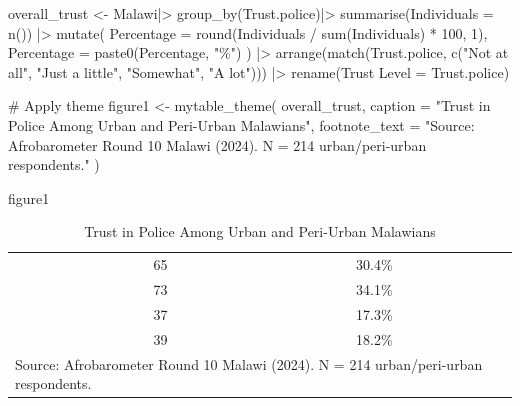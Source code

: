 \documentclass[
  letterpaper,
  DIV=11,
  numbers=noendperiod]{scrartcl}
\newenvironment{Shaded}{\begin{snugshade}}{\end{snugshade}}
\newcommand{\AttributeTok}[1]{\textcolor[rgb]{0.40,0.45,0.13}{#1}}
\newcommand{\CommentTok}[1]{\textcolor[rgb]{0.37,0.37,0.37}{#1}}
\newcommand{\DecValTok}[1]{\textcolor[rgb]{0.68,0.00,0.00}{#1}}
\newcommand{\FunctionTok}[1]{\textcolor[rgb]{0.28,0.35,0.67}{#1}}
\newcommand{\NormalTok}[1]{\textcolor[rgb]{0.00,0.23,0.31}{#1}}
\newcommand{\OtherTok}[1]{\textcolor[rgb]{0.00,0.23,0.31}{#1}}
\newcommand{\SpecialCharTok}[1]{\textcolor[rgb]{0.37,0.37,0.37}{#1}}
\newcommand{\StringTok}[1]{\textcolor[rgb]{0.13,0.47,0.30}{#1}}
\begin{document}
\begin{Shaded}
\begin{Highlighting}[]
\NormalTok{overall\_trust }\OtherTok{\textless{}{-}}\NormalTok{ Malawi}\SpecialCharTok{|\textgreater{}}
  \FunctionTok{group\_by}\NormalTok{(Trust.police)}\SpecialCharTok{|\textgreater{}}
  \FunctionTok{summarise}\NormalTok{(}\AttributeTok{Individuals =} \FunctionTok{n}\NormalTok{()) }\SpecialCharTok{|\textgreater{}}
  \FunctionTok{mutate}\NormalTok{(}
    \AttributeTok{Percentage =} \FunctionTok{round}\NormalTok{(Individuals }\SpecialCharTok{/} \FunctionTok{sum}\NormalTok{(Individuals) }\SpecialCharTok{*} \DecValTok{100}\NormalTok{, }\DecValTok{1}\NormalTok{),}
    \AttributeTok{Percentage =} \FunctionTok{paste0}\NormalTok{(Percentage, }\StringTok{"\%"}\NormalTok{)}
\NormalTok{    ) }\SpecialCharTok{|\textgreater{}}
 \FunctionTok{arrange}\NormalTok{(}\FunctionTok{match}\NormalTok{(Trust.police, }
                \FunctionTok{c}\NormalTok{(}\StringTok{"Not at all"}\NormalTok{, }\StringTok{"Just a little"}\NormalTok{, }\StringTok{"Somewhat"}\NormalTok{, }\StringTok{"A lot"}\NormalTok{))) }\SpecialCharTok{|\textgreater{}}
  \FunctionTok{rename}\NormalTok{(}\StringTok{\textasciigrave{}}\AttributeTok{Trust Level}\StringTok{\textasciigrave{}} \OtherTok{=}\NormalTok{ Trust.police)}


\CommentTok{\# Apply theme}
\NormalTok{figure1 }\OtherTok{\textless{}{-}} \FunctionTok{mytable\_theme}\NormalTok{(}
\NormalTok{  overall\_trust,}
  \AttributeTok{caption =} \StringTok{"Trust in Police Among Urban and Peri{-}Urban Malawians"}\NormalTok{,}
  \AttributeTok{footnote\_text =} \StringTok{"Source: Afrobarometer Round 10 Malawi (2024). N = 214 urban/peri{-}urban respondents."}
\NormalTok{)}

\NormalTok{figure1}
\end{Highlighting}
\end{Shaded}

\begin{table}[!h]
\centering
\caption{\label{tab:unnamed-chunk-4}Trust in Police Among Urban and Peri-Urban Malawians}
\centering
\begin{tabular}[t]{>{}lcc}
\toprule
\cellcolor[HTML]{2E86AB}{\textcolor[HTML]{F2F0EF}{\textbf{Trust Level}}} & \cellcolor[HTML]{2E86AB}{\textcolor[HTML]{F2F0EF}{\textbf{Individuals}}} & \cellcolor[HTML]{2E86AB}{\textcolor[HTML]{F2F0EF}{\textbf{Percentage}}}\\
\midrule
\cellcolor[HTML]{F2F0EF}{\textcolor[HTML]{2E86AB}{\textbf{Not at all}}} & 65 & 30.4\%\\
\cellcolor[HTML]{F2F0EF}{\textcolor[HTML]{2E86AB}{\textbf{Just a little}}} & 73 & 34.1\%\\
\cellcolor[HTML]{F2F0EF}{\textcolor[HTML]{2E86AB}{\textbf{Somewhat}}} & 37 & 17.3\%\\
\cellcolor[HTML]{F2F0EF}{\textcolor[HTML]{2E86AB}{\textbf{A lot}}} & 39 & 18.2\%\\
\bottomrule
\multicolumn{3}{l}{\rule{0pt}{1em}Source: Afrobarometer Round 10 Malawi (2024). N = 214 urban/peri-urban respondents.}\\
\end{tabular}
\end{table}
\end{document}
